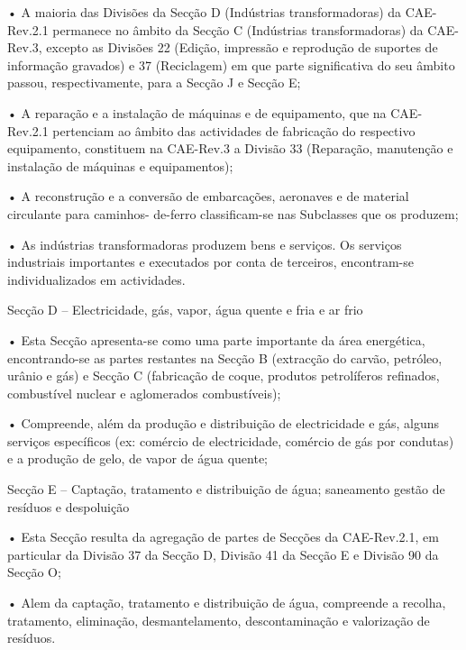              • A maioria das Divisões da Secção D (Indústrias transformadoras) da CAE-Rev.2.1 permanece no
               âmbito da Secção C (Indústrias transformadoras) da CAE-Rev.3, excepto as Divisões 22 (Edição,
               impressão e reprodução de suportes de informação gravados) e 37 (Reciclagem) em que parte
               significativa do seu âmbito passou, respectivamente, para a Secção J e Secção E;

             • A reparação e a instalação de máquinas e de equipamento, que na CAE-Rev.2.1 pertenciam ao
               âmbito das actividades de fabricação do respectivo equipamento, constituem na CAE-Rev.3 a
               Divisão 33 (Reparação, manutenção e instalação de máquinas e equipamentos);

             • A reconstrução e a conversão de embarcações, aeronaves e de material circulante para caminhos-
               de-ferro classificam-se nas Subclasses que os produzem;

             • As indústrias transformadoras produzem bens e serviços. Os serviços industriais importantes e
               executados por conta de terceiros, encontram-se individualizados em actividades.

     Secção D – Electricidade, gás, vapor, água quente e fria e ar frio

             • Esta Secção apresenta-se como uma parte importante da área energética, encontrando-se as
               partes restantes na Secção B (extracção do carvão, petróleo, urânio e gás) e Secção C (fabricação
               de coque, produtos petrolíferos refinados, combustível nuclear e aglomerados combustíveis);

             • Compreende, além da produção e distribuição de electricidade e gás, alguns serviços específicos
               (ex: comércio de electricidade, comércio de gás por condutas) e a produção de gelo, de vapor de
               água quente;

     Secção E – Captação, tratamento e distribuição de água; saneamento gestão de resíduos e despoluição

             • Esta Secção resulta da agregação de partes de Secções da CAE-Rev.2.1, em particular da Divisão
               37 da Secção D, Divisão 41 da Secção E e Divisão 90 da Secção O;

             • Alem da captação, tratamento e distribuição de água, compreende a recolha, tratamento, eliminação,
               desmantelamento, descontaminação e valorização de resíduos.

